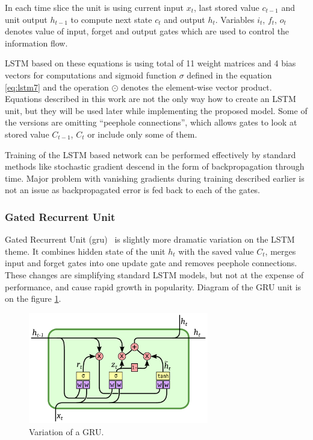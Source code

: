 In each time slice the unit is using current input $ x_t $, last stored value $ c_{t-1} $ and unit output $ h_{t-1} $ to compute next state $ c_t $ and output $ h_t $. Variables $ i_t $, $ f_t $, $ o_t $ denotes value of input, forget and output gates which are used to control the information flow.

LSTM based on these equations is using total of 11 weight matrices and 4 bias vectors for computations and sigmoid function $ \sigma $ defined in the equation \eqref{eq:lstm7} and the operation $ \odot $ denotes the element-wise vector product. Equations described in this work are not the only way how to create an LSTM unit, but they will be used later while implementing the proposed model. Some of the versions are omitting \textquotedblleft peephole connections\textquotedblright, which allows gates to look at stored value $ C_{t-1} $, $ C_t $ or include only some of them.

Training of the LSTM based network can be performed effectively by standard methods like stochastic gradient descend in the form of backpropagation through time. Major problem with vanishing gradients during training described earlier is not an issue as backpropagated error is fed back to each of the gates.


		\subsubsection{Gated Recurrent Unit}\label{subsubsec:gru}

Gated Recurrent Unit (\gls{gru})~\cite{DBLP:journals/corr/ChoMGBSB14} is slightly more dramatic variation on the LSTM theme. It combines hidden state of the unit $ h_t $ with the saved value $ C_t $, merges input and forget gates into one update gate and removes peephole connections. These changes are simplifying standard LSTM models, but not at the expense of performance, and cause rapid growth in popularity. Diagram of the GRU unit is on the figure \ref{fig:gru}.

\begin{figure}[!t]
	\centering
	\includegraphics[width=0.7\textwidth]{./fig/gru.pdf}
	\caption{Variation of a GRU.
		\label{fig:gru}}
\end{figure}

